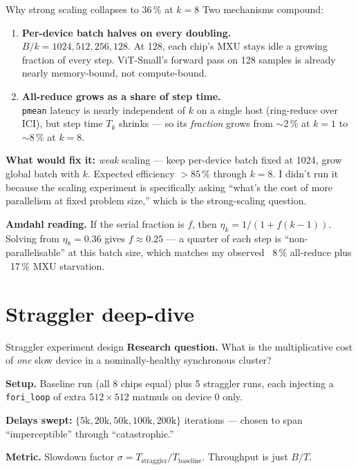 \documentclass[aspectratio=169,10pt]{beamer}
\begin{document}
\begin{frame}{Why strong scaling collapses to 36\,\% at $k=8$}
  Two mechanisms compound:
  \begin{enumerate}
    \item \textbf{Per-device batch halves on every doubling.}\\
          $B/k = 1024, 512, 256, 128$. At 128, each chip's MXU stays idle a growing
          fraction of every step. ViT-Small's forward pass on 128 samples is already
          nearly memory-bound, not compute-bound.
    \item \textbf{All-reduce grows as a share of step time.}\\
          \texttt{pmean} latency is nearly independent of $k$ on a single host
          (ring-reduce over ICI), but step time $T_k$ shrinks — so its \emph{fraction}
          grows from $\sim$2\,\% at $k=1$ to $\sim$8\,\% at $k=8$.
  \end{enumerate}

  \vspace{0.4em}
  \textbf{What would fix it:} \emph{weak} scaling — keep per-device batch fixed at 1024,
  grow global batch with $k$. Expected efficiency $>85\,\%$ through $k=8$. I didn't run
  it because the scaling experiment is specifically asking ``what's the cost of more
  parallelism at fixed problem size,'' which is the strong-scaling question.

  \vspace{0.4em}
  \textbf{Amdahl reading.} If the serial fraction is $f$, then $\eta_k = 1/(1 + f(k-1))$.
  Solving from $\eta_8 = 0.36$ gives $f \approx 0.25$ — a quarter of each step is
  ``non-parallelisable'' at this batch size, which matches my observed ~8\,\% all-reduce
  plus ~17\,\% MXU starvation.
\end{frame}

\section{Straggler deep-dive}

\begin{frame}{Straggler experiment design}
  \textbf{Research question.} What is the multiplicative cost of \emph{one} slow device
  in a nominally-healthy synchronous cluster?

  \vspace{0.4em}
  \textbf{Setup.} Baseline run (all 8 chips equal) plus 5 straggler runs, each injecting
  a \texttt{fori\_loop} of extra $512\times512$ matmuls on device 0 only.

  \vspace{0.4em}
  \textbf{Delays swept:} $\{5\text{k}, 20\text{k}, 50\text{k}, 100\text{k}, 200\text{k}\}$ iterations — chosen to span ``imperceptible'' through ``catastrophic.''

  \vspace{0.4em}
  \textbf{Metric.} Slowdown factor $\sigma = T_{\text{straggler}} / T_{\text{baseline}}$.
  Throughput is just $B/T$.
\end{frame}
\end{document}
